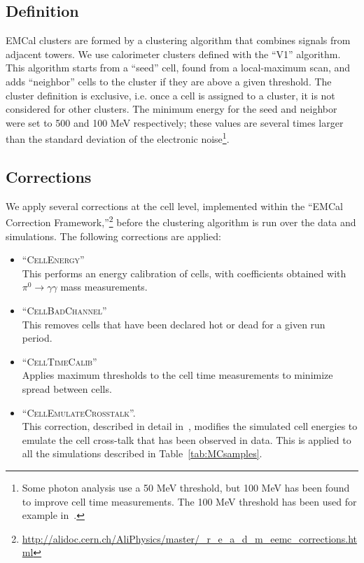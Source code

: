 \subsection{Definition}
EMCal clusters are formed by a clustering algorithm that combines signals from adjacent towers. We use calorimeter clusters defined with the ``V1'' algorithm. This algorithm starts from a ``seed'' cell, found from a local-maximum scan, and adds ``neighbor'' cells to the cluster if they are above a given threshold. The cluster definition is exclusive, i.e. once a cell is assigned to a cluster, it is not considered for other clusters. The minimum energy for the seed and neighbor were set to 500 and 100 MeV respectively; these values are several times larger than the standard deviation of the electronic noise\footnote{Some photon analysis use a 50 MeV threshold, but 100 MeV has been found to improve cell time measurements. The 100 MeV threshold has been used for example in~\cite{Acharya:2017tlv}.}.

\subsection{Corrections}
We apply several corrections at the cell level, implemented within the ``EMCal Correction Framework,''\footnote{\url{http://alidoc.cern.ch/AliPhysics/master/_r_e_a_d_m_eemc_corrections.html} } before the clustering algorithm is run over the data and simulations. The following corrections are applied: 
\begin{itemize}
\item ``\textsc{CellEnergy}''\\
This performs an energy calibration of cells, with coefficients obtained with $\pi^{0}\to\gamma\gamma$ mass measurements.
\item ``\textsc{CellBadChannel}''\\
This removes cells that have been declared hot or dead for a given run period. 
\item ``\textsc{CellTimeCalib}''\\
Applies maximum thresholds to the cell time measurements to minimize spread between cells.
\item ``\textsc{CellEmulateCrosstalk}''. \\
This correction, described in detail in~\cite{CrossTalk}, modifies the simulated cell energies to emulate the cell cross-talk that has been observed in data. This is applied to all the simulations described in Table~\ref{tab:MCsamples}. 
\end{itemize}

